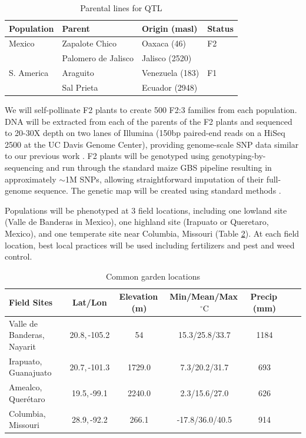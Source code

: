 \begin{table}
\begin{center}
\caption{Parental lines for QTL} \label{tab:qtlpops}
\begin{tabular}{llll}
\\\toprule  
\rowcolor{white}
{\bf Population}	& {\bf Parent } &	{\bf Origin (masl)} & {\bf Status }\\ \midrule
\rowcolor{gray!25}
Mexico	& Zapalote Chico		& Oaxaca	 (46)		&  F2 \\ 
	& 	Palomero de Jalisco	& 	Jalisco (2520)		& \\	
S. America	& Araguito	& Venezuela (183)	&  F1 \\ 
\rowcolor{white}
	& Sal Prieta	 & Ecuador (2948) & \\ \bottomrule
\end{tabular}
\end{center}
\end{table} 

We will self-pollinate F2 plants to create 500 F2:3 families from each population.  DNA will be extracted from each of the parents of the F2 plants and sequenced to 20-30X depth on two lanes of Illumina (150bp paired-end reads on a HiSeq 2500 at the UC Davis Genome Center), providing genome-scale SNP data similar to our previous work \citep[HapMap.v2;][]{Chia2012a}.  F2 plants will be genotyped using genotyping-by-sequencing \citep[GBS;][]{Elshire2011} and run through the standard maize GBS pipeline \citep{Glaubitz2014} resulting in approximately $\sim$1M SNPs, allowing straightforward imputation of their full-genome sequence.  The genetic map will be created using standard methods \citep[e.g.][]{Broman2003a}. 

Populations will be phenotyped at 3 field locations, including one lowland site (Valle de Banderas in Mexico), one highland site (Irapuato or Queretaro, Mexico), and one temperate site near Columbia, Missouri (Table \ref{tab:locales}).  At each field location, best local practices will be used including fertilizers and pest and weed control.

\begin{table}
\begin{center}
\caption{Common garden locations} \label{tab:locales}
\begin{tabular}{p{2cm}cccccc}\\\toprule  
{\bf Field Sites} & {\bf Lat/Lon } & {\bf Elevation\,(m) } &	{\bf Min/Mean/Max\,$^{\circ}\mathrm{C}$  } & {\bf Precip\,(mm) } \\ \toprule
Valle de Banderas, Nayarit	& 20.8,\,-105.2&	54		&	15.3/25.8/33.7	&	1184 \\
Irapuato, Guanajuato 	&	20.7,\,-101.3	&	1729.0	&	7.3/20.2/31.7	&	693 \\
Amealco, Quer\'etaro 	&	19.5,\,-99.1	&	2240.0 	&	2.3/15.6/27.0	&	626\\
Columbia, Missouri		& 	28.9,\,-92.2	&	266.1 	&	-17.8/36.0/40.5&	914\\ \bottomrule
\end{tabular}
\end{center}
\end{table} 

